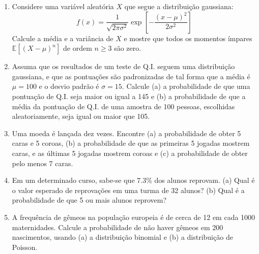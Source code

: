 \begin{enumerate}[label=\textbf{\arabic{chapter}.\arabic*.}]
	
\item Considere uma variável aleatória $X$ que segue a distribuição gaussiana:
\begin{equation*}
f(x) = \dfrac{1}{\sqrt{2\pi \sigma^2}} \exp\left[-\dfrac{(x-\mu)^2}{2\sigma^2}\right]
\end{equation*}
Calcule a média e a variância de $X$ e mostre que todos os momentos ímpares $\mathbb{E}[(X - \mu)^n]$ de ordem $n \geq 3$ são zero.

\item Assuma que os resultados de um teste de Q.I. seguem uma distribuição gaussiana, e que as pontuações são padronizadas de tal forma que a média é $\mu = 100$ e o desvio padrão é $\sigma = 15$. Calcule (a) a probabilidade de que uma pontuação de Q.I. seja maior ou igual a 145 e (b) a probabilidade de que a média da pontuação de Q.I. de uma amostra de 100 pessoas, escolhidas aleatoriamente, seja igual ou maior que 105.

\item Uma moeda é lançada dez vezes. Encontre (a) a probabilidade de obter 5 caras e 5 coroas,
(b) a probabilidade de que as primeiras 5 jogadas mostrem caras, e as últimas 5 jogadas mostrem coroas e (c) a probabilidade de obter pelo menos 7 caras.

\item Em um determinado curso, sabe-se que 7.3\% dos alunos reprovam. (a) Qual é o valor esperado de reprovações em uma turma de 32 alunos? (b) Qual é a probabilidade de que 5 ou mais alunos reprovem?

\item A frequência de gêmeos na população europeia é de cerca de 12 em cada 1000 maternidades. Calcule a probabilidade de não haver gêmeos em 200 nascimentos, usando (a) a distribuição binomial e (b) a distribuição de Poisson.
\end{enumerate}